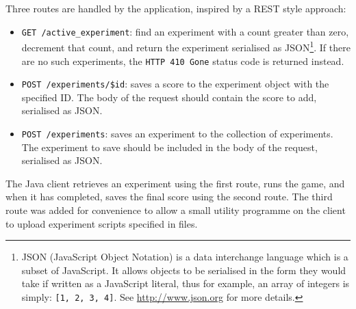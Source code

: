 Three routes are handled by the application, inspired by a REST style approach:

\begin{itemize}
\item {\tt GET /active\_experiment}: find an experiment with a count greater than zero, decrement that count, and return the experiment serialised as JSON\footnote{JSON (JavaScript Object Notation) is a data interchange language which is a subset of JavaScript.  It allows objects to be serialised in the form they would take if written as a JavaScript literal, thus for example, an array of integers is simply: {\tt [1, 2, 3, 4]}.  See \url{http://www.json.org} for more details.}.  If there are no such experiments, the {\tt HTTP 410 Gone} status code is returned instead.
\item {\tt POST /experiments/\$id}: saves a score to the experiment object with the specified ID.  The body of the request should contain the score to add, serialised as JSON.
\item {\tt POST /experiments}: saves an experiment to the collection of experiments.  The experiment to save should be included in the body of the request, serialised as JSON.
\end{itemize}

The Java client retrieves an experiment using the first route, runs the game, and when it has completed, saves the final score using the second route.  The third route was added for convenience to allow a small utility programme on the client to upload experiment scripts specified in files.



